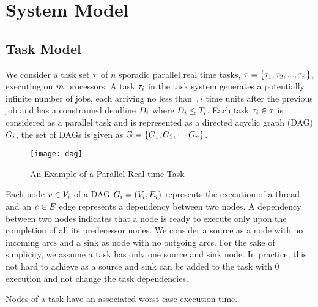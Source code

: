 \section{System Model}

\subsection{Task Model}
We consider a task set $\tau$ of ${n}$ sporadic parallel real time tasks,
$\tau = \{\tau_{1},\tau_{2}, ..., \tau_{n}\}$, executing on $m$ processors. A task $\tau_{i}$ in the task
system generates a potentially infinite number of jobs, each arriving
no less than $\period{i}$ time units after the previous job and has a constrained
deadline $D_{i}$ where $D_{i} \leq T_{i}$.  Each task $\tau_{i} \in \tau$ is
considered as a parallel task and is represented as a directed acyclic
graph (DAG) ${\Dag{i}}$, the set of DAGs is given as ${\dagset = \{\Dag{1}, \Dag{2}, \cdots \Dag{n}\}}$.

\begin{figure}[!h]
  \centering
  \texttt{[image: dag]}
  \caption{An Example of a Parallel Real-time Task}
  \label{fig:dag}
\end{figure}

Each node ${\node{1} \in \nodeset{i}}$ of a DAG ${\Dag{i} = (\nodeset{i}, \edgeset{i})}$ represents the
execution of a thread and an ${\edge \in \edgeset{}}$ edge represents a
dependency between two nodes. A dependency between two nodes indicates
that a node is ready to execute only upon the completion of all its
predecessor nodes. We consider a source as a node with no incoming
arcs and a sink as node with no outgoing arcs. For the sake of
simplicity, we assume a task has only one source and sink node. In
practice, this not hard to achieve as a source and sink can be added
to the task with $0$ execution and not change the task dependencies.

Nodes of a task have an associated worst-case execution time. 

